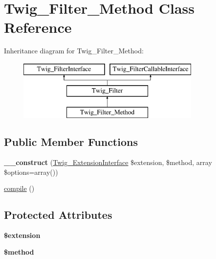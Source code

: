 \hypertarget{classTwig__Filter__Method}{}\section{Twig\+\_\+\+Filter\+\_\+\+Method Class Reference}
\label{classTwig__Filter__Method}
Inheritance diagram for Twig\+\_\+\+Filter\+\_\+\+Method\+:\begin{figure}[H]
\begin{center}
\leavevmode
\includegraphics[height=3.000000cm]{classTwig__Filter__Method}
\end{center}
\end{figure}
\subsection*{Public Member Functions}
\begin{DoxyCompactItemize}
\item 
{\bfseries \+\_\+\+\_\+construct} (\hyperlink{interfaceTwig__ExtensionInterface}{Twig\+\_\+\+Extension\+Interface} \$extension, \$method, array \$options=array())\hypertarget{classTwig__Filter__Method_a4871a4cc4876e31014388a4d463ce9aa}{}\label{classTwig__Filter__Method_a4871a4cc4876e31014388a4d463ce9aa}

\item 
\hyperlink{classTwig__Filter__Method_a24c7df1f4f44df686ed35a38586622cf}{compile} ()
\end{DoxyCompactItemize}
\subsection*{Protected Attributes}
\begin{DoxyCompactItemize}
\item 
{\bfseries \$extension}\hypertarget{classTwig__Filter__Method_a4790edf72088218e426aea01e5aa3d0c}{}\label{classTwig__Filter__Method_a4790edf72088218e426aea01e5aa3d0c}

\item 
{\bfseries \$method}\hypertarget{classTwig__Filter__Method_a8fba9e22587dff74f88b4626e41ee8eb}{}\label{classTwig__Filter__Method_a8fba9e22587dff74f88b4626e41ee8eb}

\end{DoxyCompactItemize}


